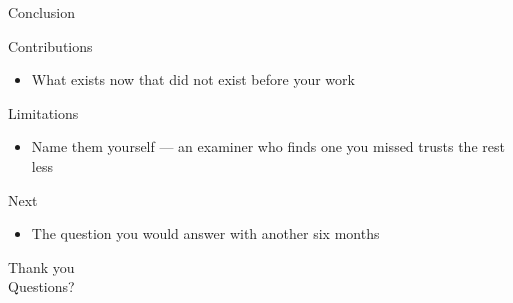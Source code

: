 
\begin{frame}{Conclusion}

\begin{block}{Contributions}
\begin{itemize}
    \item What exists now that did not exist before your work
\end{itemize}
\end{block}

\begin{block}{Limitations}
\begin{itemize}
    \item Name them yourself — an examiner who finds one you missed trusts the rest less
\end{itemize}
\end{block}

\begin{block}{Next}
\begin{itemize}
    \item The question you would answer with another six months
\end{itemize}
\end{block}

\end{frame}


\begin{frame}
\begin{center}
\Large Thank you \\[0.5cm]
\normalsize Questions?
\end{center}
\end{frame}
